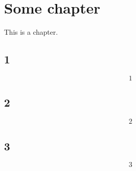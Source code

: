 \chapter{Some chapter}
This is a chapter.

\section{1}
\label{sec:1}
\begin{equation}
  \label{eq:1}
  1
\end{equation}

\section{2}
\label{sec:2}
\begin{equation}
  \label{eq:2}
  2
\end{equation}

\section{3}
\label{sec:3}
\begin{equation}
  \label{eq:3}
  3
\end{equation}

